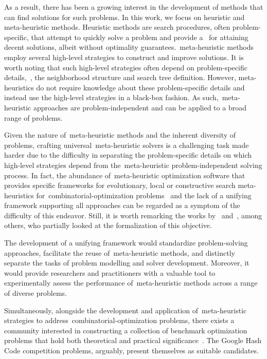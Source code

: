 As a result, there has been a growing interest in the development of methods
that can find  solutions for such problems. In this work, we
focus on heuristic and meta-heuristic methods. Heuristic methods are search
procedures, often problem-specific, that attempt to quickly solve a problem and
provide a~ for attaining decent solutions, albeit
without optimality guarantees.~\acrfull{meta-heuristic} methods employ several
high-level strategies to construct and improve solutions. It is worth noting
that such high-level strategies often depend on problem-specific details,~\eg{},
the neighborhood structure and search tree definition. However, meta-heuristics
do not require knowledge about these problem-specific details and instead use
the high-level strategies in a black-box fashion. As
such,~\acrshort{meta-heuristic} approaches are problem-independent and can be
applied to a broad range of problems.

Given the nature of~\acrshort{meta-heuristic} methods and the inherent diversity
of problems, crafting universal~\acrshort{meta-heuristic} solvers is a
challenging task made harder due to the difficulty in separating the
problem-specific details on which high-level strategies depend from
the~\acrshort{meta-heuristic} problem-independent solving process. In fact, the
abundance of~\acrshort{meta-heuristic} optimization software that provides
specific frameworks for evolutionary, local or constructive search
meta-heuristics for~\acrshort{combinatorial-optimization}
problems~\cite{cahon2004paradiseoa,digaspero2003easylocal,durillo2011jmetal} and
the lack of a unifying framework supporting all approaches can be regarded as a
symptom of the difficulty of this endeavor. Still, it is worth remarking the
works by~\citet{vieira2009uma} and~\citet{outeiro2021application}, among others,
who partially looked at the formalization of this objective.

The development of a unifying framework would standardize problem-solving
approaches, facilitate the reuse of~\acrshort{meta-heuristic} methods, and
distinctly separate the tasks of problem modelling and solver development.
Moreover, it would provide researchers and practitioners with a valuable tool to
experimentally assess the performance of~\acrshort{meta-heuristic} methods
across a range of diverse problems.

Simultaneously, alongside the development and application
of~\acrshort{meta-heuristic} strategies to
address~\acrshort{combinatorial-optimization} problems, there exists a community
interested in constructing a collection of benchmark optimization problems that
hold both theoretical and practical
significance~\cite{bartz-beielstein2020benchmarking}. The Google Hash Code
competition problems, arguably, present themselves as suitable candidates.

